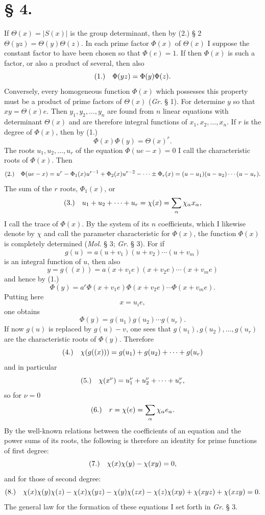 \documentclass[11pt]{article}
\newcommand{\fnum}[1]{\textup{(\ensuremath{#1}.)}\quad}
\begin{document}
\section*{§ 4.}

If $\Theta(x)=|S(x)|$ is the group determinant, then by (2.) § 2 $\Theta(yz)=\Theta(y)\Theta(z)$. In each prime factor $\Phi(x)$ of $\Theta(x)$ I suppose the constant factor to have been chosen so that $\Phi(e)=1$. If then $\Phi(x)$ is such a factor, or also a product of several, then also
\[
\fnum{1} \Phi(yz)=\Phi(y)\Phi(z).
\]
Conversely, every homogeneous function $\Phi(x)$ which possesses this property must be a product of prime factors of $\Theta(x)$ (\emph{Gr.} § 1). For determine $y$ so that $xy=\Theta(x)e$. Then $y_1,y_2,\ldots,y_n$ are found from $n$ linear equations with determinant $\Theta(x)$ and are therefore integral functions of $x_1,x_2,\ldots,x_n$. If $r$ is the degree of $\Phi(x)$, then by (1.)
\[
 \Phi(x)\Phi(y)=\Theta(x)^r.
\]
The roots $u_1,u_2,\ldots,u_r$ of the equation $\Phi(ue-x)=0$ I call the characteristic roots of $\Phi(x)$. Then
\[
\fnum{2} \Phi(ue-x)=u^r-\Phi_1(x)u^{r-1}+\Phi_2(x)u^{r-2}-\cdots\pm\Phi_r(x)
=(u-u_1)(u-u_2)\cdots(u-u_r).
\]
The sum of the $r$ roots, $\Phi_1(x)$, or
\[
\fnum{3} u_1+u_2+\cdots+u_r=\chi(x)=\sum_\alpha\chi_\alpha x_\alpha,
\]
I call the trace of $\Phi(x)$. By the system of its $n$ coefficients, which I likewise denote by $\chi$ and call the parameter characteristic for $\Phi(x)$, the function $\Phi(x)$ is completely determined (\emph{Mol.} § 3; \emph{Gr.} § 3). For if
\[
 g(u)=a(u+v_1)(u+v_2)\cdots(u+v_m)
\]
is an integral function of $u$, then also
\[
 y=g((x))=a(x+v_1e)(x+v_2e)\cdots(x+v_me)
\]
and hence by (1.)
\[
 \Phi(y)=a^r\Phi(x+v_1e)\Phi(x+v_2e)\cdots\Phi(x+v_me).
\]
Putting here
\[
 x=u_ie,
\]
one obtains
\[
 \Phi(y)=g(u_1)g(u_2)\cdots g(u_r).
\]
If now $g(u)$ is replaced by $g(u)-v$, one sees that $g(u_1),g(u_2),\ldots,g(u_r)$ are the characteristic roots of $\Phi(y)$. Therefore
\[
\fnum{4} \chi(g((x)))=g(u_1)+g(u_2)+\cdots+g(u_r)
\]
and in particular
\[
\fnum{5} \chi(x^\nu)=u_1^\nu+u_2^\nu+\cdots+u_r^\nu,
\]
so for $\nu=0$
\[
\fnum{6} r=\chi(e)=\sum_\alpha\chi_\alpha e_\alpha.
\]
By the well-known relations between the coefficients of an equation and the power sums of its roots, the following is therefore an identity for prime functions of first degree:
\[
\fnum{7} \chi(x)\chi(y)-\chi(xy)=0,
\]
and for those of second degree:
\[
\fnum{8} \chi(x)\chi(y)\chi(z)-\chi(x)\chi(yz)-\chi(y)\chi(zx)-\chi(z)\chi(xy)+\chi(xyz)+\chi(xzy)=0.
\]
The general law for the formation of these equations I set forth in \emph{Gr.} § 3.
\end{document}
